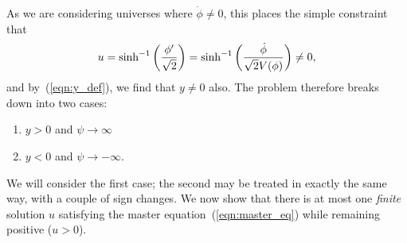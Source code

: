 As we are considering universes where $\dot{\phi}\ne 0$, this places the simple constraint that 
%
\begin{equation}
  u 
  = 
  \sinh^{-1}\left(\frac{{{\phi}^\prime}}{\sqrt 2}\right) 
  = 
  \sinh^{-1}\left(\frac{\dot\phi}{\sqrt 2 V(\phi)}\right)
  \ne 
  0,
\end{equation}
%
and by~(\ref{eqn:y_def}), we find that $y\ne0$ also.  The problem therefore breaks down into two cases: 
%
\begin{enumerate}
  \item $y>0$ and $\psi\rightarrow\infty$
  \item $y<0$ and $\psi\rightarrow -\infty$.
\end{enumerate}
%
We will consider the first case; the second may be treated in exactly the same way, with a couple of sign changes.  We now show that there is at most one {\em finite}\/ solution $u$ satisfying the master equation~(\ref{eqn:master_eq}) while remaining positive ($u>0$).

